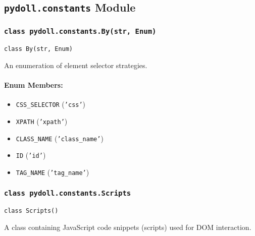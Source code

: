 \documentclass{article}
\begin{document}
\hrulefill

\subsection*{\texttt{pydoll.constants} Module}

\subsubsection*{\texttt{class pydoll.constants.By(str, Enum)}}
\noindent\texttt{class By(str, Enum)}

\noindent An enumeration of element selector strategies.

\paragraph{Enum Members:}
\begin{itemize}
    \item \texttt{CSS\_SELECTOR} (\texttt{'css'})
    \item \texttt{XPATH} (\texttt{'xpath'})
    \item \texttt{CLASS\_NAME} (\texttt{'class\_name'})
    \item \texttt{ID} (\texttt{'id'})
    \item \texttt{TAG\_NAME} (\texttt{'tag\_name'})
\end{itemize}

\subsubsection*{\texttt{class pydoll.constants.Scripts}}
\noindent\texttt{class Scripts()}

\noindent A class containing JavaScript code snippets (scripts) used for DOM interaction.
\end{document}
